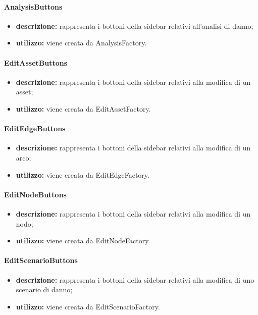 \paragraph{AnalysisButtons}
\begin{itemize}
	\item \textbf{descrizione:} rappresenta i bottoni della sidebar relativi all'analisi di danno;
	\item \textbf{utilizzo:} viene creata da AnalysisFactory.
\end{itemize}
\paragraph{EditAssetButtons}
\begin{itemize}
	\item \textbf{descrizione:} rappresenta i bottoni della sidebar relativi alla modifica di un asset;
	\item \textbf{utilizzo:} viene creata da EditAssetFactory.
\end{itemize}
\paragraph{EditEdgeButtons}
\begin{itemize}
	\item \textbf{descrizione:} rappresenta i bottoni della sidebar relativi alla modifica di un arco;
	\item \textbf{utilizzo:} viene creata da EditEdgeFactory.
\end{itemize}
\paragraph{EditNodeButtons}
\begin{itemize}
	\item \textbf{descrizione:} rappresenta i bottoni della sidebar relativi alla modifica di un nodo;
	\item \textbf{utilizzo:} viene creata da EditNodeFactory.
\end{itemize}
\paragraph{EditScenarioButtons}
\begin{itemize}
	\item \textbf{descrizione:} rappresenta i bottoni della sidebar relativi alla modifica di uno scenario di danno;
	\item \textbf{utilizzo:} viene creata da EditScenarioFactory.
\end{itemize}
